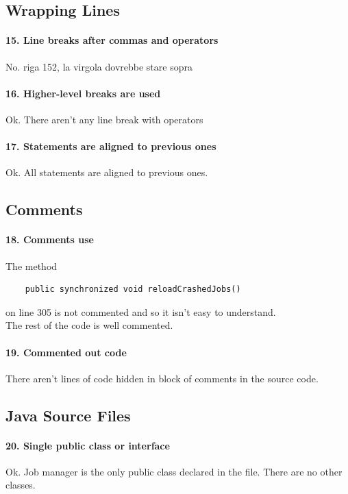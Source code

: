 \documentclass[english]{article}
\begin{document}
\subsection{Wrapping Lines}
\paragraph{15. Line breaks after commas and operators}
No.
riga 152, la virgola dovrebbe stare sopra %

\paragraph{16. Higher-level breaks are used}
 Ok. There aren't any line break with operators

\paragraph{17. Statements are aligned to previous ones}
Ok. All statements are aligned to previous ones.

\subsection{Comments}

\paragraph{18. Comments use}
The method 
\begin{lstlisting} 
	public synchronized void reloadCrashedJobs() 
\end{lstlisting}

 on line 305 is not commented and so it isn't easy to understand. \\
The rest of the code is well commented.

\paragraph{19. Commented out code}
There aren't lines of code hidden in block of comments in the source code.

\subsection{Java Source Files}
\paragraph{20. Single public class or interface}
Ok.
Job manager is the only public class declared in the file.
There are no other classes.
\end{document}
